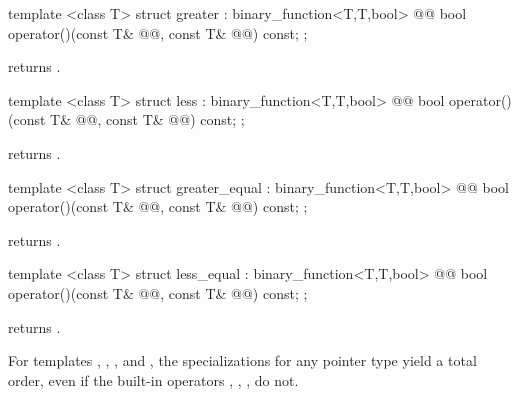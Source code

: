 \documentclass[american,twoside]{book}
\begin{document}
%
\begin{itemdecl}
template <class T> struct greater : binary_function<T,T,bool> {
  @@
    bool operator()(const T& @@, const T& @@) const;
};
\end{itemdecl}

\begin{itemdescr}
\pnum
{} returns .
\end{itemdescr}

%
\begin{itemdecl}
template <class T> struct less : binary_function<T,T,bool> {
  @@
    bool operator()(const T& @@, const T& @@) const;
};
\end{itemdecl}

\begin{itemdescr}
\pnum
{} returns .
\end{itemdescr}

%
\begin{itemdecl}
template <class T> struct greater_equal : binary_function<T,T,bool> {
  @@
    bool operator()(const T& @@, const T& @@) const;
};
\end{itemdecl}

\begin{itemdescr}
\pnum
{} returns .
\end{itemdescr}

%
\begin{itemdecl}
template <class T> struct less_equal : binary_function<T,T,bool> {
  @@
    bool operator()(const T& @@, const T& @@) const;
};
\end{itemdecl}

\begin{itemdescr}
\pnum
{} returns .
\end{itemdescr}

\pnum
For templates , , , and
, the specializations for any pointer type yield a total order,
even if the built-in operators \tcode{<}, \tcode{>}, \tcode{<=}, \tcode{>=}
do not.
\end{document}
